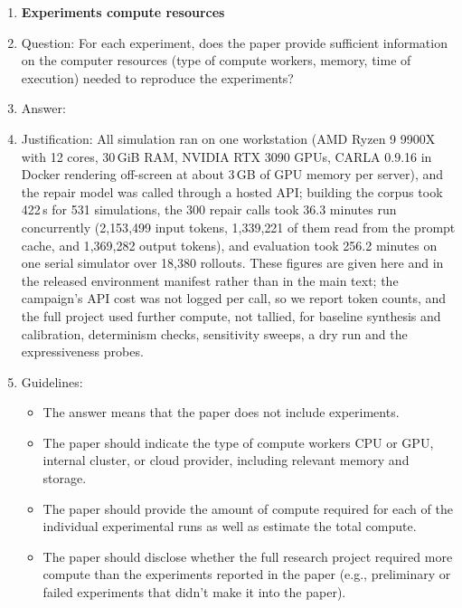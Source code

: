 \begin{enumerate}
\item {\bf Experiments compute resources}
    \item[] Question: For each experiment, does the paper provide sufficient information on the computer resources (type of compute workers, memory, time of execution) needed to reproduce the experiments?
    \item[] Answer: \answerYes{}
    \item[] Justification: All simulation ran on one workstation (AMD Ryzen 9 9900X with 12 cores, 30\,GiB RAM, NVIDIA RTX 3090 GPUs, CARLA 0.9.16 in Docker rendering off-screen at about 3\,GB of GPU memory per server), and the repair model was called through a hosted API; building the corpus took 422\,s for 531 simulations, the 300 repair calls took 36.3 minutes run concurrently (2{,}153{,}499 input tokens, 1{,}339{,}221 of them read from the prompt cache, and 1{,}369{,}282 output tokens), and evaluation took 256.2 minutes on one serial simulator over 18{,}380 rollouts. These figures are given here and in the released environment manifest rather than in the main text; the campaign's API cost was not logged per call, so we report token counts, and the full project used further compute, not tallied, for baseline synthesis and calibration, determinism checks, sensitivity sweeps, a dry run and the expressiveness probes.
    \item[] Guidelines:
    \begin{itemize}
        \item The answer \answerNA{} means that the paper does not include experiments.
        \item The paper should indicate the type of compute workers CPU or GPU, internal cluster, or cloud provider, including relevant memory and storage.
        \item The paper should provide the amount of compute required for each of the individual experimental runs as well as estimate the total compute.
        \item The paper should disclose whether the full research project required more compute than the experiments reported in the paper (e.g., preliminary or failed experiments that didn't make it into the paper).
    \end{itemize}


\end{enumerate}
